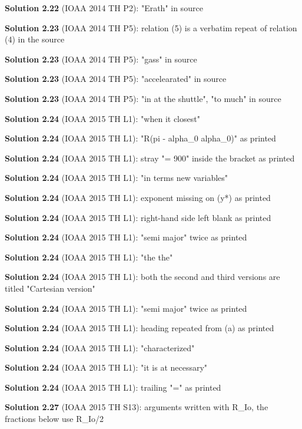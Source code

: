 \noindent\textbf{Solution 2.22} (IOAA 2014 TH P2): "Erath" in source
\smallskip

\noindent\textbf{Solution 2.23} (IOAA 2014 TH P5): relation (5) is a verbatim repeat of relation (4) in the source
\smallskip

\noindent\textbf{Solution 2.23} (IOAA 2014 TH P5): "gass" in source
\smallskip

\noindent\textbf{Solution 2.23} (IOAA 2014 TH P5): "accelearated" in source
\smallskip

\noindent\textbf{Solution 2.23} (IOAA 2014 TH P5): "in at the shuttle", "to much" in source
\smallskip

\noindent\textbf{Solution 2.24} (IOAA 2015 TH L1): "when it closest"
\smallskip

\noindent\textbf{Solution 2.24} (IOAA 2015 TH L1): "R(pi - alpha\_0 alpha\_0)" as printed
\smallskip

\noindent\textbf{Solution 2.24} (IOAA 2015 TH L1): stray "= 900" inside the bracket as printed
\smallskip

\noindent\textbf{Solution 2.24} (IOAA 2015 TH L1): "in terms new variables"
\smallskip

\noindent\textbf{Solution 2.24} (IOAA 2015 TH L1): exponent missing on (y*) as printed
\smallskip

\noindent\textbf{Solution 2.24} (IOAA 2015 TH L1): right-hand side left blank as printed
\smallskip

\noindent\textbf{Solution 2.24} (IOAA 2015 TH L1): "semi major" twice as printed
\smallskip

\noindent\textbf{Solution 2.24} (IOAA 2015 TH L1): "the the"
\smallskip

\noindent\textbf{Solution 2.24} (IOAA 2015 TH L1): both the second and third versions are titled "Cartesian version"
\smallskip

\noindent\textbf{Solution 2.24} (IOAA 2015 TH L1): "semi major" twice as printed
\smallskip

\noindent\textbf{Solution 2.24} (IOAA 2015 TH L1): heading repeated from (a) as printed
\smallskip

\noindent\textbf{Solution 2.24} (IOAA 2015 TH L1): "characterized"
\smallskip

\noindent\textbf{Solution 2.24} (IOAA 2015 TH L1): "it is at necessary"
\smallskip

\noindent\textbf{Solution 2.24} (IOAA 2015 TH L1): trailing "=" as printed
\smallskip

\noindent\textbf{Solution 2.27} (IOAA 2015 TH S13): arguments written with R\_Io, the fractions below use R\_Io/2
\smallskip

